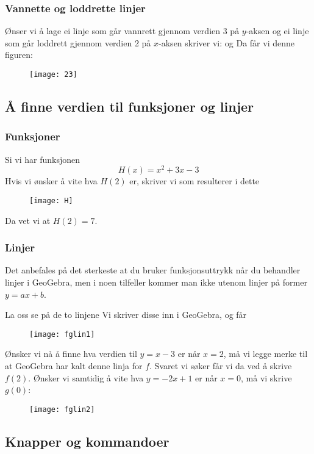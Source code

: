 \subsubsection{Vannette og loddrette linjer}

Ønser vi å lage ei linje som går vannrett gjennom verdien 3 på $ y $-aksen og ei linje som går loddrett gjennom verdien 2 på $ x $-aksen skriver vi:
og 
Da får vi denne figuren:
\begin{figure}[H]
	\centering
	\texttt{[image: 23]}
\end{figure}

\subsection{Å finne verdien til funksjoner og linjer}
\subsubsection{Funksjoner}
Si vi har funksjonen
\[H(x)= x^2 + 3x -3 \]
Hvis vi ønsker å vite hva $ H(2) $ er, skriver vi
som resulterer i dette
\begin{figure}[H]
	\centering
	\texttt{[image: H]}
\end{figure}
Da vet vi at $ H(2)=7 $.
\subsubsection{Linjer}
Det anbefales på det sterkeste at du bruker funksjonsuttrykk når du behandler linjer i GeoGebra, men i noen tilfeller kommer man ikke utenom linjer på former $ y=ax+b $. \vsk

La oss se på de to linjene \vs
{}
Vi skriver disse inn i GeoGebra, og får
\begin{figure}[H]
	\centering
	\texttt{[image: fglin1]}
\end{figure}
Ønsker vi nå å finne hva verdien til $ {y=x-3} $ er når $ {x=2} $, må vi legge merke til at GeoGebra har kalt denne linja for $ f $. Svaret vi søker får vi da ved å skrive $ f(2) $. Ønsker vi samtidig å vite hva $ {y=-2x+1} $ er når $ {x=0} $, må vi skrive $ g(0) $:
\begin{figure}[H]
	\centering
	\texttt{[image: fglin2]}
\end{figure}

\newpage
\subsection{Knapper og kommandoer}

